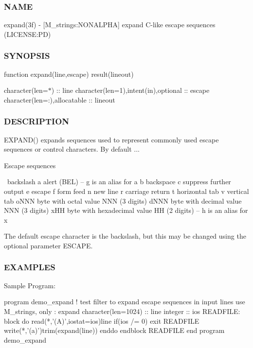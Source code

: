 \subsubsection*{N\+A\+ME}

expand(3f) -\/ \mbox{[}M\+\_\+strings\+:N\+O\+N\+A\+L\+P\+HA\mbox{]} expand C-\/like escape sequences (L\+I\+C\+E\+N\+SE\+:PD) 

\subsubsection*{S\+Y\+N\+O\+P\+S\+IS}

function expand(line,escape) result(lineout)

character(len=$\ast$) \+:\+: line character(len=1),intent(in),optional \+:\+: escape character(len=\+:),allocatable \+:\+: lineout \subsubsection*{D\+E\+S\+C\+R\+I\+P\+T\+I\+ON}

\begin{DoxyVerb}EXPAND() expands sequences used to represent commonly used escape sequences
or control characters. By default ...

 Escape sequences

   \      backslash
   a      alert (BEL) -- g is an alias for a
   b      backspace
   c      suppress further output
   e      escape
   f      form feed
   n      new line
   r      carriage return
   t      horizontal tab
   v      vertical tab
   oNNN   byte with octal value NNN (3 digits)
   dNNN   byte with decimal value NNN (3 digits)
   xHH    byte with hexadecimal value HH (2 digits) -- h is an alias for x

The default escape character is the backslash, but this may be changed using
the optional parameter ESCAPE.
\end{DoxyVerb}


\subsubsection*{E\+X\+A\+M\+P\+L\+ES}

Sample Program\+: \begin{DoxyVerb} program demo_expand
 !  test filter to expand escape sequences in input lines
 use M_strings, only : expand
 character(len=1024) :: line
 integer             :: ios
    READFILE: block
       do
          read(*,'(A)',iostat=ios)line
          if(ios /= 0) exit READFILE
          write(*,'(a)')trim(expand(line))
       enddo
    endblock READFILE
 end program demo_expand
\end{DoxyVerb}



